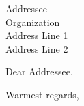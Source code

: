 \documentclass[12pt]{letter}
\begin{document}
\begin{letter}{ Addressee \\ Organization \\ Address Line 1 \\ Address Line 2 }

	\opening{Dear Addressee,}

	\lipsum[2-3]

	\closing{Warmest regards,}

\end{letter}
\end{document}
